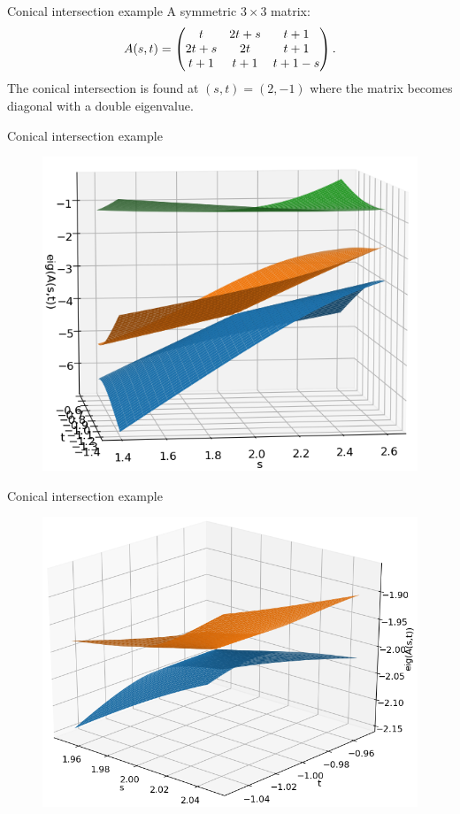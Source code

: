 \documentclass{beamer}
\begin{document}
\iffalse %
\begin{frame}{Conical intersection example}
    A symmetric $3 \times 3$ matrix:
    \begin{equation}
        A(s,t)=
        \begin{pmatrix}
            t & 2t+s & t+1 \cr 2t+s & 2t & t+1 \cr t+1 & t+1 & t+1-s
        \end{pmatrix}
        .
    \end{equation}
    The conical intersection is found at $(s,t)=(2,-1)$ where the matrix becomes diagonal with a double eigenvalue.
\end{frame}
\begin{frame}{Conical intersection example}
    \begin{figure}[h]
        \centering
        \includegraphics[scale=0.5]{img/slide/conint_3sheet_angle9.png}
        \label{fig:conint}
    \end{figure}
\end{frame}
\begin{frame}{Conical intersection example}
    \begin{figure}[h]
        \centering
        \includegraphics[scale=0.5]{img/slide/conint_3sheet_angle8.png}
        \label{fig:conint}
    \end{figure}
\end{frame}
\end{document}
